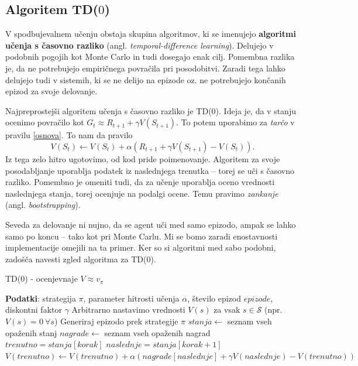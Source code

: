 \documentclass[12pt,a4paper]{amsart}
\theoremstyle{definition} %
\theoremstyle{plain} %
\begin{document}
\subsection{Algoritem TD($0$)}
V spodbujevalnem učenju obstaja skupina algoritmov, ki se imenujejo \textbf{algoritmi učenja s 
časovno razliko} (angl. \textit{temporal-difference learning}). Delujejo v podobnih pogojih kot 
Monte Carlo in tudi dosegajo enak cilj. Pomembna razlika je, da ne potrebujejo empiričnega povračila 
pri posodobitvi. Zaradi tega lahko delujejo tudi v sistemih, ki se ne delijo na epizode oz. ne 
potrebujejo končanih epizod za svoje delovanje.

Najpreprostejši algoritem učenja s časovno razliko je TD($0$). Ideja je, da v stanju ocenimo
povračilo kot $G_t \approx R_{t+1} + \gamma V(S_{t+1}).$ To potem uporabimo za \textit{tarčo}
v pravilu \eqref{osnova}. To nam da pravilo
\begin{equation}
    V(S_t) \leftarrow V(S_t) + \alpha (R_{t+1} + \gamma V(S_{t+1}) - V(S_t)).
\end{equation}
Iz tega zelo hitro ugotovimo, od kod pride poimenovanje. Algoritem za svoje posodabljanje uporablja 
podatek iz naslednjega trenutka -- torej se uči s časovno razliko. Pomembno je omeniti tudi, da za 
učenje uporablja oceno vrednosti naslednjega stanja, torej ocenjuje na podalgi ocene. Temu pravimo 
\textit{zankanje} (angl. \textit{bootstrapping}). 

Seveda za delovanje ni nujno, da se agent uči med samo epizodo, ampak se lahko samo po koncu -- tako 
kot pri Monte Carlu. Mi se bomo zaradi enostavnosti implementacije omejili na ta primer. Ker so si 
algoritmi med sabo podobni, zadošča navesti zgled algoritma za TD($0$).

\begin{algorithm}[H]
    \caption{TD($0$) - ocenjevnaje  $V \approx v_\pi$}
\begin{algorithmic}
    
    \STATE \textbf{Podatki}: strategija $\pi$, parameter hitrosti učenja $\alpha$, število epizod $epizode$, 
            diskontni faktor $\gamma$
    \STATE 
    \STATE Arbitrarno nastavimo vrednosti $V(s)$ za vsak $s \in \mathcal{S}$ (npr. $V(s) = 0~\forall s$)
    \STATE
        \STATE Generiraj epizodo prek strategije $\pi$
        \STATE $stanja \leftarrow$ seznam vseh opaženih stanj
        \STATE $nagrade \leftarrow$ seznam vseh opaženih nagrad
        \STATE
        \STATE $trenutno = stanja[korak]$
        \STATE $naslednje = stanja[korak + 1]$
        \STATE $V(trenutno) \leftarrow V(trenutno) + \alpha (nagrade[naslednje] + \gamma V(naslednje) - 
        V(trenutno))$ 
        \ENDFOR
    \ENDFOR

\end{algorithmic}
\end{algorithm}
\end{document}

